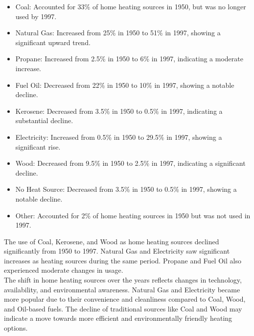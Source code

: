 \documentclass{article}
\begin{document}
\begin{itemize}
    \item
    Coal:
        Accounted for 33\% of home heating sources in 1950, but was no longer used by 1997.
    \item
    Natural Gas:
        Increased from 25\% in 1950 to 51\% in 1997, showing a significant upward trend.
    \item
    Propane:
        Increased from 2.5\% in 1950 to 6\% in 1997, indicating a moderate increase.
    \item
    Fuel Oil:
        Decreased from 22\% in 1950 to 10\% in 1997, showing a notable decline.
    \item
    Kerosene:
        Decreased from 3.5\% in 1950 to 0.5\% in 1997, indicating a substantial decline.
    \item
    Electricity:
        Increased from 0.5\% in 1950 to 29.5\% in 1997, showing a significant rise.
    \item
    Wood:
        Decreased from 9.5\% in 1950 to 2.5\% in 1997, indicating a significant decline.
    \item
    No Heat Source:
        Decreased from 3.5\% in 1950 to 0.5\% in 1997, showing a notable decline.
    \item
    Other:
        Accounted for 2\% of home heating sources in 1950 but was not used in 1997.
\end{itemize}
The use of Coal, Kerosene, and Wood as home heating sources declined significantly from 1950 to 1997.
Natural Gas and Electricity saw significant increases as heating sources during the same period.
Propane and Fuel Oil also experienced moderate changes in usage.
\vspace{0.5cm}\\
The shift in home heating sources over the years reflects changes in technology, availability, and environmental awareness.
Natural Gas and Electricity became more popular due to their convenience and cleanliness compared to Coal, Wood, and Oil-based fuels.
The decline of traditional sources like Coal and Wood may indicate a move towards more efficient and environmentally friendly heating options.
\end{document}

